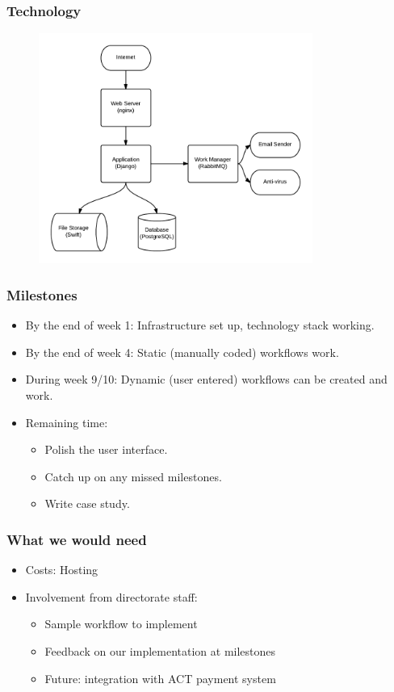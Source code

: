 \documentclass{beamer}
\begin{document}
\begin{frame}
  \frametitle{Technology}
  \begin{figure}[h!]
    \centering
    \includegraphics[width=0.8\textwidth]{./imgs/tech-overview.png}
  \end{figure}
\end{frame}

\begin{frame}
  \frametitle{Milestones}
  \begin{itemize}
  \item By the end of week 1: Infrastructure set up, technology stack
    working.
  \item By the end of week 4: Static (manually coded) workflows work.
  \item During week 9/10: Dynamic (user entered) workflows can be
    created and work.
  \item Remaining time:
    \begin{itemize}
    \item Polish the user interface.
    \item Catch up on any missed milestones.
    \item Write case study.
    \end{itemize}
  \end{itemize}
\end{frame}

\begin{frame}
  \frametitle{What we would need}
  \begin{itemize}
  \item Costs: Hosting
  \item Involvement from directorate staff: 
    \begin{itemize}
    \item Sample workflow to implement
    \item Feedback on our implementation at milestones
    \item Future: integration with ACT payment system
    \end{itemize}
  \end{itemize}
\end{frame}
\end{document}
